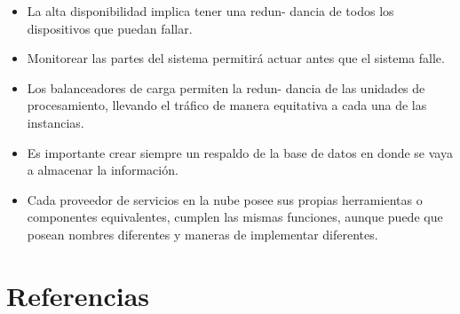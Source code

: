 \documentclass[12pt,spanish,Letterpaper,openany]{book}
\newcommand{\spacetwomilis}{\vspace{2mm}}
\newcommand{\spaceminusmilis}{\vspace{-0.5mm}}
\begin{document}
\begin{itemize}
\item
  La alta disponibilidad implica tener una redun-
  dancia de todos los dispositivos que puedan fallar.
  \spaceminusmilis
\item
  Monitorear las partes del sistema permitirá actuar antes que el sistema falle.
  \spaceminusmilis
\item
  Los balanceadores de carga permiten la redun-
  dancia de las unidades de procesamiento, llevando el tráfico de manera equitativa a cada una de las instancias.
  \spaceminusmilis
\item
  Es importante crear siempre un respaldo de la base de datos en donde se vaya a almacenar la información.
\item
  Cada proveedor de servicios en la nube posee sus propias herramientas o componentes equivalentes, cumplen las mismas funciones, aunque puede que posean nombres diferentes y maneras de implementar diferentes.
\end{itemize}

\hypertarget{referencias-7}{%
\section*{Referencias}\label{referencias-7}}

\spacetwomilis
\end{document}
